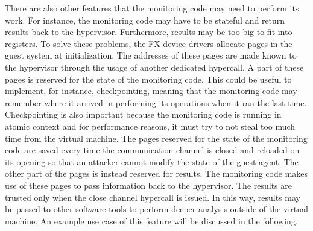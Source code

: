 \par %
There are also other features that the monitoring code may need to perform its work. For instance, the monitoring code may have to be stateful and return results back to the hypervisor. Furthermore, results may be too big to fit into registers. To solve these problems, the FX device drivers allocate pages in the guest system at initialization. The addresses of these pages are made known to the hypervisor through the usage of another dedicated hypercall. A part of these pages is reserved for the state of the monitoring code. This could be useful to implement, for instance, checkpointing, meaning that the monitoring code may remember where it arrived in performing its operations when it ran the last time. Checkpointing is also important because the monitoring code is running in atomic context and for performance reasons, it must try to not steal too much time from the virtual machine. The pages reserved for the state of the monitoring code are saved every time the communication channel is closed and reloaded on its opening so that an attacker cannot modify the state of the guest agent. The other part of the pages is instead reserved for results. The monitoring code makes use of these pages to pass information back to the hypervisor. The results are trusted only when the close channel hypercall is issued. In this way, results may be passed to other software tools to perform deeper analysis outside of the virtual machine. An example use case of this feature will be discussed in the following.


